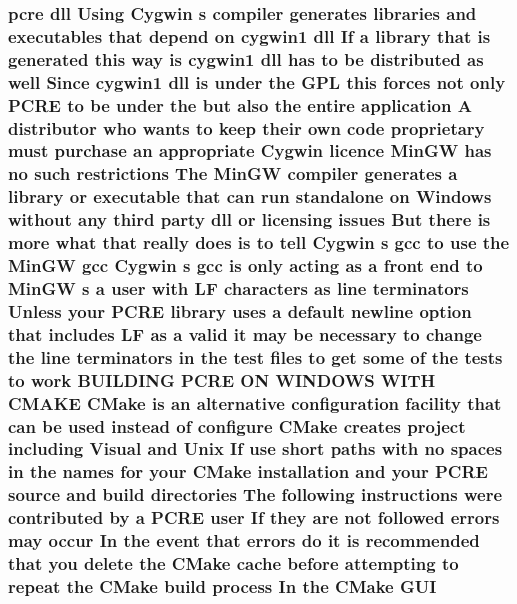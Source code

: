 \subsubsection[{\texorpdfstring{G\+UI}{GUI}}]{ {\bf pcre} dll Using Cygwin {\bf s} {\bf compiler} generates {\bf libraries} and executables that depend {\bf on} cygwin1 dll If {\bf a} {\bf library} that {\bf is} {\bf generated} {\bf this} {\bf way} {\bf is} cygwin1 dll has {\bf to} {\bf be} {\bf distributed} {\bf as} well Since cygwin1 dll {\bf is} under the {\bf G\+PL} {\bf this} forces {\bf not} only {\bf P\+C\+RE} {\bf to} {\bf be} under the but also the entire application {\bf A} distributor who wants {\bf to} keep their own {\bf code} proprietary must purchase an appropriate Cygwin {\bf licence} {\bf Min\+GW} has no such restrictions The {\bf Min\+GW} {\bf compiler} generates {\bf a} {\bf library} {\bf or} executable that {\bf can} {\bf run} standalone {\bf on} {\bf Windows} without {\bf any} third party dll {\bf or} licensing issues But there {\bf is} more {\bf what} that really does {\bf is} {\bf to} tell Cygwin {\bf s} {\bf gcc} {\bf to} use the {\bf Min\+GW} {\bf gcc} Cygwin {\bf s} {\bf gcc} {\bf is} only acting {\bf as} {\bf a} front {\bf end} {\bf to} {\bf Min\+GW} {\bf s} {\bf a} user {\bf with} {\bf LF} {\bf characters} {\bf as} {\bf line} terminators Unless your {\bf P\+C\+RE} {\bf library} uses {\bf a} {\bf default} {\bf newline} {\bf option} that includes {\bf LF} {\bf as} {\bf a} valid {\bf it} may {\bf be} necessary {\bf to} change the {\bf line} terminators {\bf in} the test {\bf files} {\bf to} get some {\bf of} the {\bf tests} {\bf to} work B\+U\+I\+L\+D\+I\+NG {\bf P\+C\+RE} ON W\+I\+N\+D\+O\+WS W\+I\+TH C\+M\+A\+KE C\+Make {\bf is} an alternative configuration {\bf facility} that {\bf can} {\bf be} {\bf used} instead {\bf of} {\bf configure} C\+Make creates {\bf project} including Visual and Unix If use short paths {\bf with} no spaces {\bf in} the {\bf names} for your C\+Make installation and your {\bf P\+C\+RE} {\bf source} and build {\bf directories} The following {\bf instructions} were contributed by {\bf a} {\bf P\+C\+RE} user If they {\bf are} {\bf not} followed {\bf errors} may {\bf occur} In the event that {\bf errors} {\bf do} {\bf it} {\bf is} recommended that you delete the C\+Make {\bf cache} before attempting {\bf to} repeat the C\+Make build {\bf process} In the C\+Make G\+UI}\hypertarget{NON-AUTOTOOLS-BUILD_8txt_aff9a3e890dd507634d0c1d92a586c6bc}{}\label{NON-AUTOTOOLS-BUILD_8txt_aff9a3e890dd507634d0c1d92a586c6bc}

